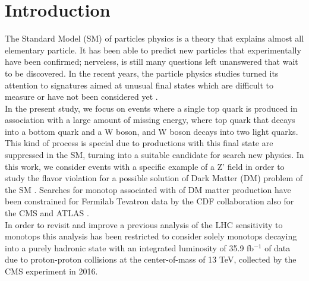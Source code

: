 \section{Introduction}
\label{sec:introduction}

The Standard Model (SM) of particles physics is a theory that explains almost all elementary particle. It has been able to predict new particles that experimentally have been confirmed; nerveless, is still many questions left unanswered that wait to be discovered. In the recent years, the particle physics studies turned its attention to signatures aimed at unusual final states which are difficult to measure or have not been considered yet \cite{318}.\\ 

In the present study, we focus on events where a single top quark is produced in association with a large amount of missing energy, where top quark that decays into a bottom quark and a W boson, and W boson decays into two light quarks. This kind of process is special due to productions with this final state are suppressed in the SM, turning into a suitable candidate for search new physics. In this work, we consider events with a specific example of a Z' field in order to study the flavor violation for a possible solution of Dark Matter (DM) problem of the SM \cite{319}. Searches for monotop associated with of DM matter production have been constrained for Fermilab Tevatron data by the CDF \cite{321} collaboration also for the CMS \cite{322} and ATLAS \cite{323}.\\

In order to revisit and improve a previous analysis of the LHC sensitivity to monotops this analysis has been restricted to consider solely monotops decaying into a purely hadronic state with an integrated luminosity of 35.9 fb$^{-1}$ of data due to proton-proton collisions at the center-of-mass of 13 TeV, collected by the CMS experiment in 2016. 

\clearpage
